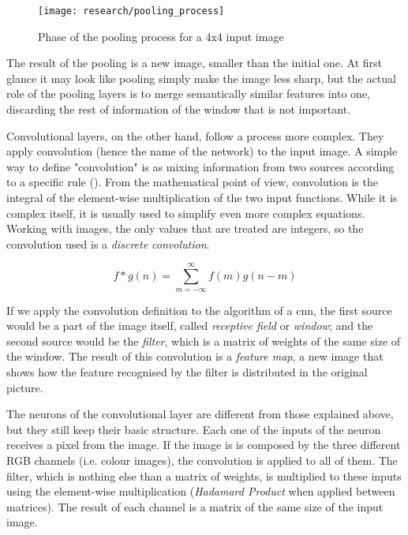 \begin{figure}[!ht]
	\centering
	\vspace{0.3cm}
	\texttt{[image: research/pooling\_process]}
	\caption{Phase of the pooling process for a 4x4 input image}
	\label{fig:pooling_proc}
\end{figure}

The result of the pooling is a new image, smaller than the initial one. At first glance it may look like pooling simply make the image less sharp, but the actual role of the pooling layers is to merge semantically similar features into one, discarding the rest of information of the window that is not important.

Convolutional layers, on the other hand, follow a process more complex. They apply convolution (hence the name of the network) to the input image. A simple way to define "convolution" is as mixing information from two sources according to a specific rule (\cite{lecun2015deep}). From the mathematical point of view, convolution is the integral of the element-wise multiplication of the two input functions. While it is complex itself, it is usually used to simplify even more complex equations. Working with images, the only values that are treated are integers, so the convolution used is a \textit{discrete convolution}. 

\begin{equation}
	\label{discrete_conv}
	f*g(n) = \sum_{m= -\infty}^{\infty} f(m) g(n-m) 
\end{equation}

If we apply the convolution definition to the algorithm of a \gls{cnn}, the first source would be a part of the image itself, called \textit{receptive field} or \textit{window}; and the second source would be the \textit{filter}, which is a matrix of weights of the same size of the window. The result of this convolution is a \textit{feature map}, a new image that shows how the feature recognised by the filter is distributed in the original picture. 

The neurons of the convolutional layer are different from those explained above, but they still keep their basic structure. Each one of the inputs of the neuron receives a pixel from the image. If the image is is composed by the three different RGB channels (i.e. colour images), the convolution is applied to all of them. The filter, which is nothing else than a matrix of weights, is multiplied to these inputs using the element-wise multiplication (\textit{Hadamard Product} when applied between matrices). The result of each channel is a matrix of the same size of the input image. 

